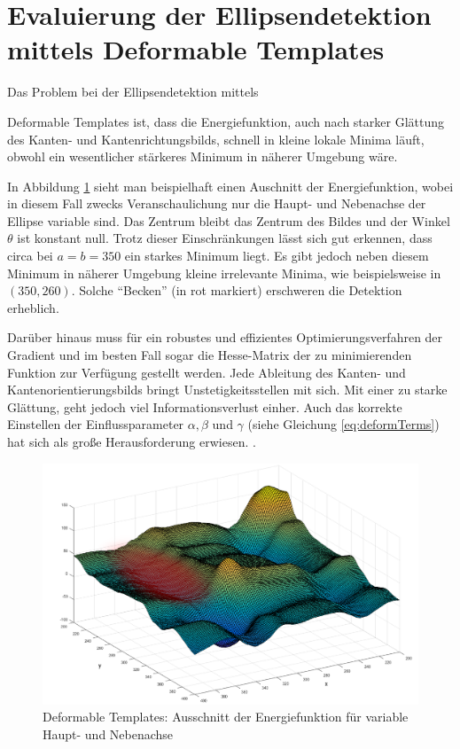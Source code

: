 \section{Evaluierung der Ellipsendetektion mittels Deformable Templates}
Das Problem bei der Ellipsendetektion mittels {Deformable Templates ist, dass die Energiefunktion, auch nach starker Glättung des Kanten- und Kantenrichtungsbilds, schnell in kleine lokale Minima läuft, obwohl ein wesentlicher stärkeres Minimum in näherer Umgebung wäre. 

In Abbildung \ref{fig:deformable} sieht man beispielhaft einen Auschnitt der Energiefunktion, wobei in diesem Fall zwecks Veranschaulichung nur die Haupt- und Nebenachse der Ellipse variable sind. Das Zentrum bleibt das Zentrum des Bildes und der Winkel $\theta$ ist konstant null. Trotz dieser Einschränkungen lässt sich gut erkennen, dass circa bei $a = b = 350$ ein starkes Minimum liegt. Es gibt jedoch neben diesem Minimum in näherer Umgebung kleine irrelevante Minima, wie beispielsweise in $(350, 260)$. Solche "`Becken"' (in rot markiert) erschweren die Detektion erheblich.

Darüber hinaus muss für ein robustes und effizientes Optimierungsverfahren der Gradient und im besten Fall sogar die Hesse-Matrix der zu minimierenden Funktion zur Verfügung gestellt werden.  Jede Ableitung des Kanten- und Kantenorientierungsbilds bringt Unstetigkeitsstellen mit sich. Mit einer zu starke Glättung, geht jedoch viel Informationsverlust einher. Auch das korrekte Einstellen der Einflussparameter $\alpha,\beta$ und $\gamma$ (siehe Gleichung \ref{eq:deformTerms}) hat sich als große Herausforderung erwiesen. .


\begin{figure}[!htb]
	\centering
	\includegraphics[scale=.4]{images/deformableHighlighted.png}
	\caption{Deformable Templates: Ausschnitt der Energiefunktion für variable Haupt- und Nebenachse}
	\label{fig:deformable}
\end{figure}


}
